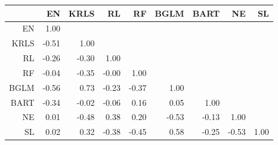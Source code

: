 \begin{table}[ht]
\centering
\begin{tabular}{rrrrrrrrr}
  \hline
 & EN & KRLS & RL & RF & BGLM & BART & NE & SL \\ 
  \hline
EN & 1.00 &  &  &  &  &  &  &  \\ 
  KRLS & -0.51 & 1.00 &  &  &  &  &  &  \\ 
  RL & -0.26 & -0.30 & 1.00 &  &  &  &  &  \\ 
  RF & -0.04 & -0.35 & -0.00 & 1.00 &  &  &  &  \\ 
  BGLM & -0.56 & 0.73 & -0.23 & -0.37 & 1.00 &  &  &  \\ 
  BART & -0.34 & -0.02 & -0.06 & 0.16 & 0.05 & 1.00 &  &  \\ 
  NE & 0.01 & -0.48 & 0.38 & 0.20 & -0.53 & -0.13 & 1.00 &  \\ 
  SL & 0.02 & 0.32 & -0.38 & -0.45 & 0.58 & -0.25 & -0.53 & 1.00 \\ 
   \hline
\end{tabular}
\end{table}
